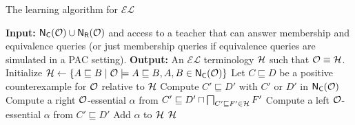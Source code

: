 \begin{algorithm}
    \captionsetup{font=\algCaptionSize}
    \caption{The learning algorithm for $\mathcal{EL}$~\cite{DBLP:conf/kr/DuarteKO18}}
    \label{alg:learn}
    \begin{algorithmic}[1]\algCodeSize
        \State \textbf{Input:} ${\sf N_C}(\mathcal{O}) \cup {\sf N_R}(\mathcal{O})$ and access to a teacher that can answer membership and equivalence queries (or just membership queries if equivalence queries are simulated in a PAC setting).
        \State \textbf{Output:} An $\mathcal{EL}$ terminology $\mathcal{H}$ such that $\mathcal{O} \equiv \mathcal{H}$.
        \Statex
        \State Initialize $\mathcal{H} \gets \{A \sqsubseteq B \mid \mathcal{O} \models A \sqsubseteq B, A,B\in {\sf N_C}(\mathcal{O})\}$
        \While{$\Hmc \not\equiv \Omc$} \label{line:while}
            \State Let $C \sqsubseteq D$ be a positive counterexample for $\mathcal{O}$ relative to $\mathcal{H}$
            \State Compute $C' \sqsubseteq D'$ with $C'$ or $D'$ in ${\sf N_C}(\mathcal{O})$
            \label{line:counterexample}
                \State Compute a right $\mathcal{O}$-essential $\alpha$ from $ C' \sqsubseteq D' \sqcap \bigsqcap_{C' \sqsubseteq F' \in \mathcal{H}} F' $
                \label{line:right-essential}
            \Else
                \State Compute a left $\mathcal{O}$-essential $\alpha$ from $C' \sqsubseteq D'$
                \label{line:left-essential}
            \EndIf
            \State Add $\alpha$ to $\mathcal{H}$
            \label{line:add-to-hypothesis}
        \EndWhile
        \State \Return $\mathcal{H}$
    \end{algorithmic}
\end{algorithm}